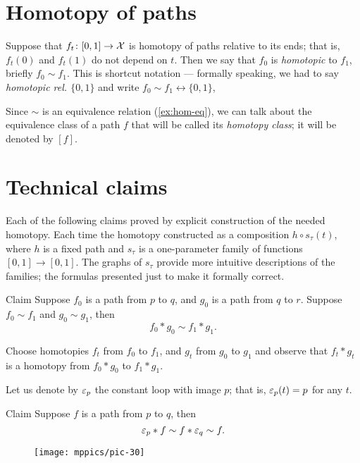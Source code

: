 \section{Homotopy of paths}

Suppose that $f_t\colon[0,1]\to\mathcal{X}$ is homotopy of paths relative to its ends;
that is, $f_t(0)$ and $f_t(1)$ do not depend on $t$.
Then we say that $f_0$ is \emph{homotopic} to  $f_1$, briefly $f_0\sim f_1$.
This is shortcut notation --- formally speaking, we had to say \emph{homotopic rel. $\{0,1\}$} and write $f_0\sim f_1\rel{\{0,1\}}$,

Since $\sim$ is an equivalence relation (\ref{ex:hom-eq}), we can talk about the equivalence class of a path $f$ that will be called its \emph{homotopy class};
it will be denoted by $[f]$.



\section{Technical claims}\label{sec:homotopy-claim}

Each of the following claims proved by explicit construction of the needed homotopy.
Each time the homotopy constructed as a composition $h\circ s_\tau(t)$, where $h$ is a fixed path and  $s_\tau$ is a one-parameter family of functions $[0,1]\to [0,1]$.
The graphs of $s_\tau$ provide more intuitive descriptions of the families;
the formulas presented just to make it formally correct.

\begin{thm}{Claim}\label{clm:product}
Suppose $f_0$ is a path from $p$ to $q$,
and 
$g_0$ is a path from $q$ to $r$.
Suppose $f_0\sim f_1$ and $g_0\sim g_1$,
then
\[f_0*g_0\sim f_1*g_1.\]
\end{thm}

Choose homotopies $f_t$ from $f_0$ to $f_1$, and $g_t$ from $g_0$ to $g_1$ and observe that 
$f_t*g_t$ is a homotopy from $f_0*g_0$ to $f_1*g_1$.
\qeds

Let us denote by $\varepsilon_p$ the constant loop with image $p$;
that is, $\varepsilon_p(t)=p$ for any $t$.

\begin{thm}{Claim}\label{clm:neutral}
Suppose $f$ is a path from $p$ to $q$, then
\[\varepsilon_p*f\sim f*\varepsilon_q\sim  f.\]
\end{thm}

\begin{wrapfigure}[4]{r}{30mm}
\centering
\vskip-5mm
\texttt{[image: mppics/pic-30]}
\end{wrapfigure}

